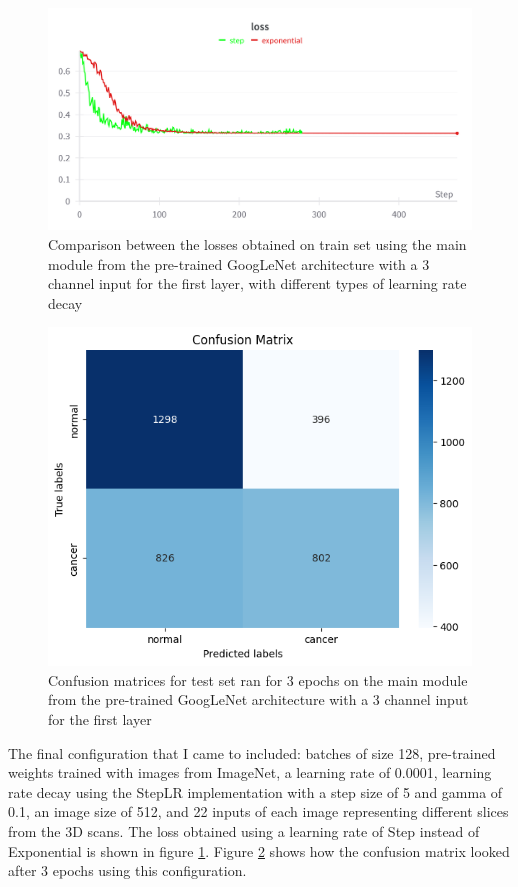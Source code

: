 \begin{figure}[!ht]
    \centering
    \includegraphics[width=1\linewidth]{figures/Figure24.png}
    \caption{Comparison between the losses obtained on train set using the main module from the pre-trained GoogLeNet architecture with a 3 channel input for the first layer, with different types of learning rate decay}
    \label{fig:fig22}
\end{figure}

\begin{figure}[H]
    \centering
    \includegraphics[width=0.5\linewidth]{figures/Figure37.png}
    \caption{Confusion matrices for test set ran for 3 epochs on the main module from the pre-trained GoogLeNet architecture with a 3 channel input for the first layer}
    \label{fig:fig31}
\end{figure}

The final configuration that I came to included: batches of size 128, pre-trained weights trained with images from ImageNet, a learning rate of 0.0001, learning rate decay using the StepLR implementation with a step size of 5 and gamma of 0.1, an image size of 512, and 22 inputs of each image representing different slices from the 3D scans. The loss obtained using a learning rate of Step instead of Exponential is shown in figure \ref{fig:fig22}. Figure \ref{fig:fig31} shows how the confusion matrix looked after 3 epochs using this configuration.

